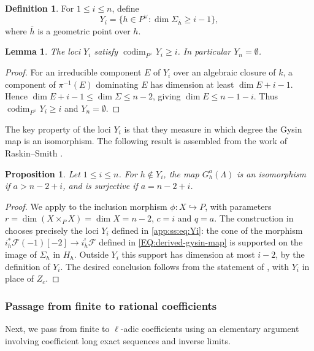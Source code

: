 \documentclass[a4paper,11pt, twoside,reqno]{amsart}
\theoremstyle{plain}
\newtheorem{lemma}[thm]{Lemma}
\newtheorem{prop}[thm]{Proposition}
\theoremstyle{definition}
\newtheorem{defin}[thm]{Definition}
\theoremstyle{remark}
\DeclareMathOperator{\codim}{codim}
\renewcommand{\bar}{\overline}
\renewcommand{\le}{\leqslant}
\renewcommand{\leq}{\leqslant}
\renewcommand{\geq}{\geqslant}
\numberwithin{equation}{section}
\begin{document}
\begin{defin}\label{app:ss:def:Yi}
For $1\leq i\leq n$, define
\begin{equation}\label{app:ss:eq:Yi}
 Y_i=\{h\in P^\vee:\dim\Sigma_{\bar h}\geq i-1\},
\end{equation}
where $\bar h$ is a geometric point over $h$.
\end{defin}

\begin{lemma}\label{app:ss:lem:dimension}
The loci $Y_i$ satisfy $\codim_{P^\vee}Y_i\geq i$.
In particular $Y_n=\emptyset$.
\end{lemma}
\begin{proof}
For an irreducible component
$E$ of $Y_i$ over an algebraic closure of $k$, a component of $\pi^{-1}(E)$
dominating $E$ has dimension at least $\dim E+i-1$. Hence
$\dim E+i-1\leq\dim\Sigma\leq n-2$, giving
$\dim E\leq n-1-i$. Thus $\codim_{P^\vee}Y_i\geq i$ and $Y_n=\emptyset$.
\end{proof}

The key property of the loci $Y_i$ is that they measure in which degree the Gysin map is an isomorphism.
The following result is assembled from the work of Raskin--Smith \cite{RS}.
\begin{prop}\label{app:ss:prop:RS}
Let $1\le i\le n$.
For $h\notin Y_i$, the map $G_h^a(\Lambda)$
is an isomorphism if $a>n-2+i$, and is surjective if $a=n-2+i$.
\end{prop}
\begin{proof}
We apply \cite[Theorem~1.2 and its proof]{RS} to
the inclusion morphism $\phi:X\hookrightarrow P$,
with parameters $r=\dim(X\times_P X)=\dim X=n-2$, $c=i$ and $q=a$.
The construction in \cite[Theorem~2.2, Corollary~2.3 and their proofs]{RS} chooses
precisely the loci $Y_i$ defined in \eqref{app:ss:eq:Yi}:
the cone of the morphism $i_h^*\mathcal F(-1)[-2]\to i_h^!\mathcal F$
defined in \eqref{EQ:derived-gysin-map}
is supported on
the image of $\Sigma_h$ in $H_h$.
Outside $Y_i$ this support has dimension at most $i-2$,
by the definition of $Y_i$.
The desired conclusion follows from the statement of \cite[Theorem~1.2]{RS},
with $Y_i$ in place of $Z_c$.
\end{proof}

\subsubsection{Passage from finite to rational coefficients}
Next, we pass from finite to $\ell$-adic coefficients using an elementary argument involving coefficient
long exact sequences and inverse limits.
\end{document}
